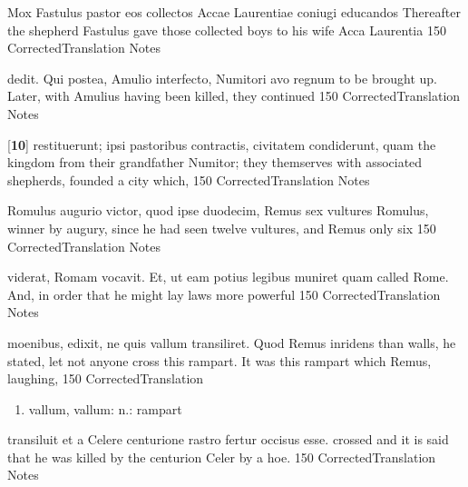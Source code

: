\latline
  {Mox Fastulus pastor eos collectos Accae Laurentiae coniugi educandos }
  { Thereafter the shepherd Fastulus gave those collected boys to his wife Acca Laurentia }
  {150}
  { CorrectedTranslation }
  { Notes }


\latline
  {dedit. Qui postea, Amulio interfecto, Numitori avo regnum }
  { to be brought up.  Later, with Amulius having been killed, they continued }
  {150}
  { CorrectedTranslation }
  { Notes }


\latline
  {[\textbf{10}] restituerunt; ipsi pastoribus contractis, civitatem condiderunt, quam }
  { the kingdom from their grandfather Numitor; they themserves with associated shepherds, founded a city which,  }
  {150}
  { CorrectedTranslation }
  { Notes }


\latline
  {Romulus augurio victor, quod ipse duodecim, Remus sex vultures }
  { Romulus, winner by augury, since he had seen twelve vultures, and Remus only six }
  {150}
  { CorrectedTranslation }
  { Notes }


\latline
  {viderat, Romam vocavit.  Et, ut eam potius legibus muniret quam }
  { called Rome.  And, in order that he might lay laws more powerful}
  {150}
  { CorrectedTranslation }
  { Notes }


\latline
  {moenibus, edixit, ne quis vallum transiliret.  Quod Remus inridens}
  { than walls, he stated, let not anyone cross this rampart.  It was this rampart which Remus, laughing, }
  {150}
  { CorrectedTranslation }
  { \begin{enumerate}
  	\item vallum, vallum: n.:  rampart
  \end{enumerate} }


\latline
  {transiluit et a Celere centurione rastro fertur occisus esse.}
  { crossed and it is said that he was killed by the centurion Celer by a hoe. }
  {150}
  { CorrectedTranslation }
  { Notes }





